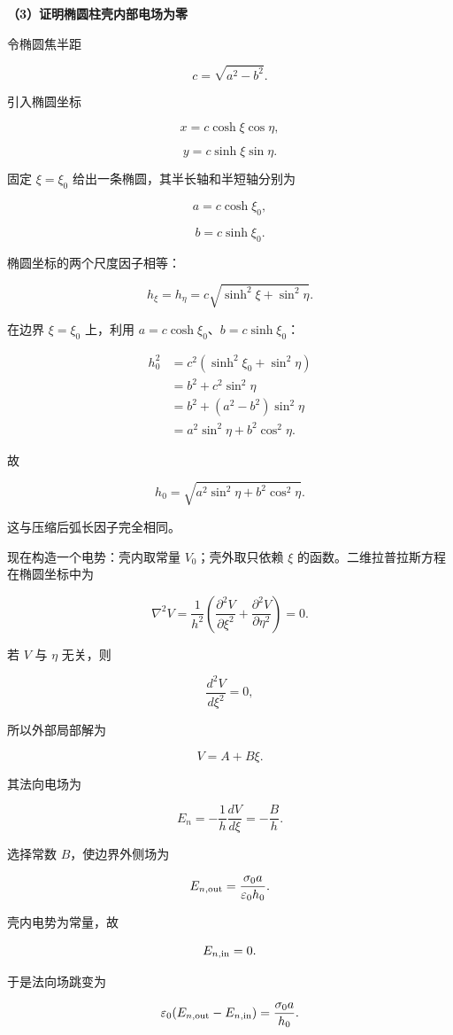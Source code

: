 \documentclass[12pt,a4paper,UTF8]{ctexart}
\begin{document}
\textbf{（3）证明椭圆柱壳内部电场为零}

令椭圆焦半距

\[c=\sqrt{a^2-b^2}.\]

引入椭圆坐标

\[x=c\cosh\xi\cos\eta,\]

\[y=c\sinh\xi\sin\eta.\]

固定 \(\xi=\xi_0\) 给出一条椭圆，其半长轴和半短轴分别为

\[a=c\cosh\xi_0,\]

\[b=c\sinh\xi_0.\]

椭圆坐标的两个尺度因子相等：

\[h_\xi=h_\eta
=c\sqrt{\sinh^2\xi+\sin^2\eta}.\]

在边界 \(\xi=\xi_0\) 上，利用 \(a=c\cosh\xi_0\)、\(b=c\sinh\xi_0\)：

\[\begin{aligned}
h_0^2
&=c^2(\sinh^2\xi_0+\sin^2\eta)\\
&=b^2+c^2\sin^2\eta\\
&=b^2+(a^2-b^2)\sin^2\eta\\
&=a^2\sin^2\eta+b^2\cos^2\eta.
\end{aligned}\]

故

\[h_0=\sqrt{a^2\sin^2\eta+b^2\cos^2\eta}.\]

这与压缩后弧长因子完全相同。

现在构造一个电势：壳内取常量 \(V_0\)；壳外取只依赖 \(\xi\)
的函数。二维拉普拉斯方程在椭圆坐标中为

\[\nabla^2V=\frac1{h^2}
\left(\frac{\partial^2V}{\partial\xi^2}
+\frac{\partial^2V}{\partial\eta^2}\right)=0.\]

若 \(V\) 与 \(\eta\) 无关，则

\[\frac{d^2V}{d\xi^2}=0,\]

所以外部局部解为

\[V=A+B\xi.\]

其法向电场为

\[E_n=-\frac1h\frac{dV}{d\xi}=-\frac Bh.\]

选择常数 \(B\)，使边界外侧场为

\[E_{n,\rm out}=\frac{\sigma_0a}{\varepsilon_0h_0}.\]

壳内电势为常量，故

\[E_{n,\rm in}=0.\]

于是法向场跳变为

\[\varepsilon_0(E_{n,\rm out}-E_{n,\rm in})
=\frac{\sigma_0a}{h_0}.\]
\end{document}
